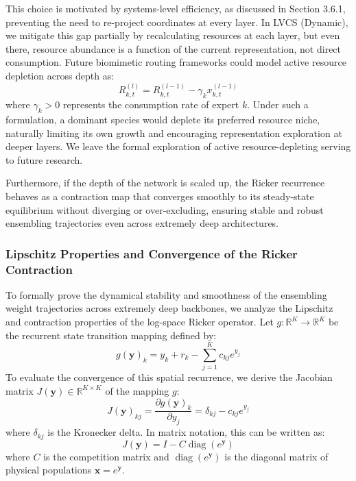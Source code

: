 This choice is motivated by systems-level efficiency, as discussed in Section 3.6.1, preventing the need to re-project coordinates at every layer. In LVCS (Dynamic), we mitigate this gap partially by recalculating resources at each layer, but even there, resource abundance is a function of the current representation, not direct consumption. Future biomimetic routing frameworks could model active resource depletion across depth as:
\begin{equation}
    R_{k, t}^{(l)} = R_{k, t}^{(l-1)} - \gamma_k x_{k, t}^{(l-1)}
\end{equation}
where $\gamma_k > 0$ represents the consumption rate of expert $k$. Under such a formulation, a dominant species would deplete its preferred resource niche, naturally limiting its own growth and encouraging representation exploration at deeper layers. We leave the formal exploration of active resource-depleting serving to future research.

Furthermore, if the depth of the network is scaled up, the Ricker recurrence behaves as a contraction map that converges smoothly to its steady-state equilibrium without diverging or over-excluding, ensuring stable and robust ensembling trajectories even across extremely deep architectures.

\subsubsection{Lipschitz Properties and Convergence of the Ricker Contraction}
To formally prove the dynamical stability and smoothness of the ensembling weight trajectories across extremely deep backbones, we analyze the Lipschitz and contraction properties of the log-space Ricker operator. Let $g: \mathbb{R}^K \to \mathbb{R}^K$ be the recurrent state transition mapping defined by:
\begin{equation}
    g(\mathbf{y})_k = y_k + r_k - \sum_{j=1}^K c_{kj} e^{y_j}
\end{equation}
To evaluate the convergence of this spatial recurrence, we derive the Jacobian matrix $J(\mathbf{y}) \in \mathbb{R}^{K \times K}$ of the mapping $g$:
\begin{equation}
    J(\mathbf{y})_{kj} = \frac{\partial g(\mathbf{y})_k}{\partial y_j} = \delta_{kj} - c_{kj} e^{y_j}
\end{equation}
where $\delta_{kj}$ is the Kronecker delta. In matrix notation, this can be written as:
\begin{equation}
    J(\mathbf{y}) = I - C \operatorname{diag}(e^{\mathbf{y}})
\end{equation}
where $C$ is the competition matrix and $\operatorname{diag}(e^{\mathbf{y}})$ is the diagonal matrix of physical populations $\mathbf{x} = e^{\mathbf{y}}$. 

